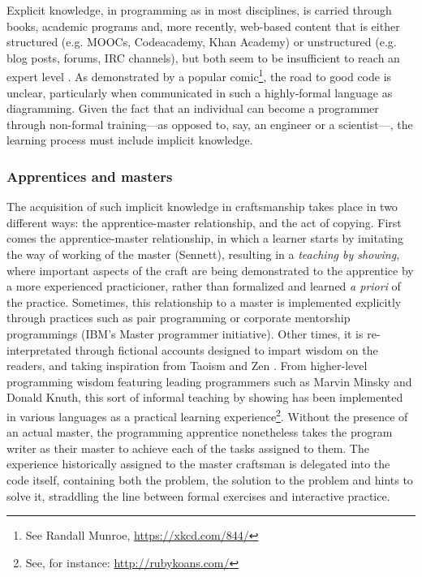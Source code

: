 Explicit knowledge, in programming as in most disciplines, is carried through books, academic programs and, more recently, web-based content that is either structured (e.g. MOOCs, Codeacademy, Khan Academy) or unstructured (e.g. blog posts, forums, IRC channels), but both seem to be insufficient to reach an expert level \citep{davies_models_1993}. As demonstrated by a popular comic\footnote{See Randall Munroe, \url{https://xkcd.com/844/}}, the road to good code is unclear, particularly when communicated in such a highly-formal language as diagramming. Given the fact that an individual can become a programmer through non-formal training---as opposed to, say, an engineer or a scientist---, the learning process must include implicit knowledge.

\subsubsection{Apprentices and masters}

The acquisition of such implicit knowledge in craftsmanship takes place in two different ways: the apprentice-master relationship, and the act of copying. First comes the apprentice-master relationship, in which a learner starts by  imitating the way of working of the master (Sennett), resulting in a \emph{teaching by showing}, where important aspects of the craft are being demonstrated to the apprentice by a more experienced practicioner, rather than formalized and learned \emph{a priori} of the practice. Sometimes, this relationship to a master is implemented explicitly through practices such as pair programming \citep{williams_pair_2003} or corporate mentorship programmings (IBM's Master programmer initiative). Other times, it is re-interpretated through fictional accounts designed to impart wisdom on the readers, and taking inspiration from Taoism and Zen \citep{james_tao_1987,raymond_new_1996}. From higher-level programming wisdom featuring leading programmers such as Marvin Minsky and Donald Knuth, this sort of informal teaching by showing has been implemented in various languages as a practical learning experience\footnote{See, for instance: \url{http://rubykoans.com/}}. Without the presence of an actual master, the programming apprentice nonetheless takes the program writer as their master to achieve each of the tasks assigned to them. The experience historically assigned to the master craftsman is delegated into the code itself, containing both the problem, the solution to the problem and hints to solve it, straddling the line between formal exercises and interactive practice.

